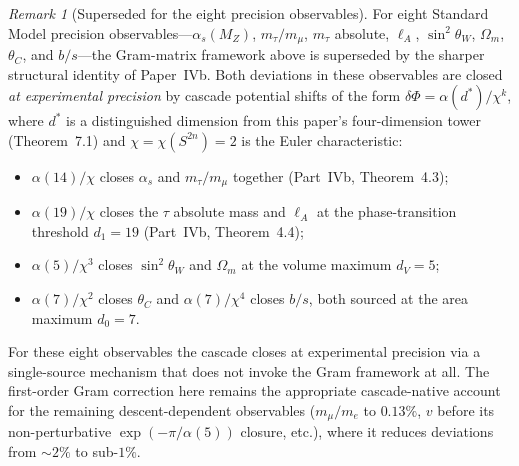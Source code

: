 \documentclass[12pt,a4paper]{article}
\theoremstyle{remark}
\newtheorem*{remark}{Remark}
\begin{document}
\begin{remark}[Superseded for the eight precision observables]\label{rem:superseded-by-family}
For eight Standard Model precision observables---$\alpha_s(M_Z)$, $m_\tau/m_\mu$, $m_\tau$ absolute, $\ell_A$, $\sin^2\theta_W$, $\Omega_m$, $\theta_C$, and $b/s$---the Gram-matrix framework above is superseded by the sharper structural identity of Paper~IVb. Both deviations in these observables are closed \emph{at experimental precision} by cascade potential shifts of the form $\delta\Phi = \alpha(d^*)/\chi^k$, where $d^*$ is a distinguished dimension from this paper's four-dimension tower (Theorem~7.1) and $\chi=\chi(S^{2n})=2$ is the Euler characteristic:
\begin{itemize}
\item $\alpha(14)/\chi$ closes $\alpha_s$ and $m_\tau/m_\mu$ together (Part~IVb, Theorem~4.3);
\item $\alpha(19)/\chi$ closes the $\tau$ absolute mass and $\ell_A$ at the phase-transition threshold $d_1=19$ (Part~IVb, Theorem~4.4);
\item $\alpha(5)/\chi^3$ closes $\sin^2\theta_W$ and $\Omega_m$ at the volume maximum $d_V=5$;
\item $\alpha(7)/\chi^2$ closes $\theta_C$ and $\alpha(7)/\chi^4$ closes $b/s$, both sourced at the area maximum $d_0=7$.
\end{itemize}
For these eight observables the cascade closes at experimental precision via a single-source mechanism that does not invoke the Gram framework at all. The first-order Gram correction here remains the appropriate cascade-native account for the remaining descent-dependent observables ($m_\mu/m_e$ to $0.13\%$, $v$ before its non-perturbative $\exp(-\pi/\alpha(5))$ closure, etc.), where it reduces deviations from $\sim 2\%$ to sub-$1\%$.
\end{remark}
\end{document}
